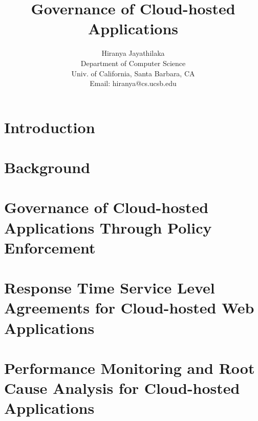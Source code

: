 \documentclass[12pt]{article}
\begin{document}
\date{}

\title{Governance of Cloud-hosted Applications}

\author{Hiranya Jayathilaka\\
Department of Computer Science\\
Univ. of California, Santa Barbara, CA\\
Email: hiranya@cs.ucsb.edu
}
\maketitle

\section{Introduction}


\section{Background}


\section{Governance of Cloud-hosted Applications Through Policy Enforcement}


\section{Response Time Service Level Agreements for Cloud-hosted Web Applications}


\section{Performance Monitoring and Root Cause Analysis for Cloud-hosted Applications}




\end{document}
